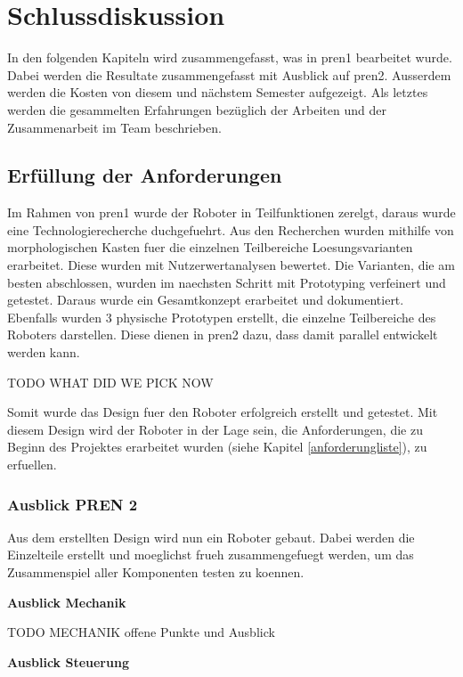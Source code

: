 \section{Schlussdiskussion}

In den folgenden Kapiteln wird zusammengefasst, was in \acrshort{pren1} bearbeitet wurde.
Dabei werden die Resultate zusammengefasst mit Ausblick auf \acrshort{pren2}.
Ausserdem werden die Kosten von diesem und nächstem Semester aufgezeigt.
Als letztes werden die gesammelten Erfahrungen bezüglich der Arbeiten und der Zusammenarbeit im Team beschrieben.

\subsection{Erfüllung der Anforderungen}

Im Rahmen von \acrshort{pren1} wurde der Roboter in Teilfunktionen zerelgt, daraus wurde eine Technologierecherche duchgefuehrt. Aus den Recherchen wurden mithilfe von morphologischen Kasten fuer die einzelnen Teilbereiche Loesungsvarianten erarbeitet. Diese wurden mit Nutzerwertanalysen bewertet. Die Varianten, die am besten abschlossen, wurden im naechsten Schritt mit Prototyping verfeinert und getestet. Daraus wurde ein Gesamtkonzept erarbeitet und dokumentiert. Ebenfalls wurden 3 physische Prototypen erstellt, die einzelne Teilbereiche des Roboters darstellen. Diese dienen in \acrshort{pren2} dazu, dass damit parallel entwickelt werden kann.

TODO WHAT DID WE PICK NOW

Somit wurde das Design fuer den Roboter erfolgreich erstellt und getestet. Mit diesem Design wird der Roboter in der Lage sein, die Anforderungen, die zu Beginn des Projektes erarbeitet wurden (siehe Kapitel \ref{anforderungliste}), zu erfuellen.

\subsubsection{Ausblick PREN 2}

Aus dem erstellten Design wird nun ein Roboter gebaut. Dabei werden die Einzelteile erstellt und moeglichst frueh zusammengefuegt werden, um das Zusammenspiel aller Komponenten testen zu koennen.

\textbf{Ausblick Mechanik}

TODO MECHANIK offene Punkte und Ausblick

\textbf{Ausblick Steuerung}

